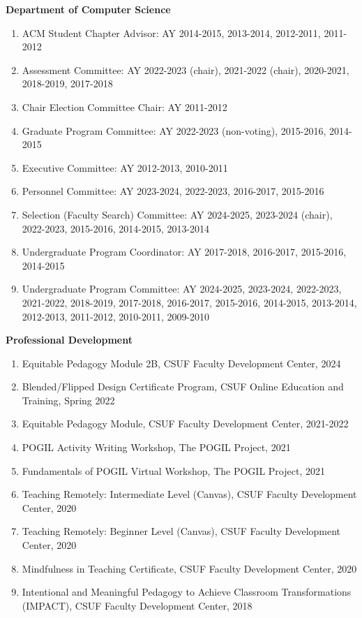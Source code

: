 \documentclass[11pt]{letter}
\begin{document}
\textbf{Department of Computer Science}
\begin{enumerate}
\item ACM Student Chapter Advisor: AY 2014-2015, 2013-2014, 2012-2011, 2011-2012
\item Assessment Committee: AY 2022-2023 (chair), 2021-2022 (chair), 2020-2021, 2018-2019, 2017-2018
\item Chair Election Committee Chair: AY 2011-2012
\item Graduate Program Committee: AY 2022-2023 (non-voting), 2015-2016, 2014-2015
\item Executive Committee: AY 2012-2013, 2010-2011
\item Personnel Committee: AY 2023-2024, 2022-2023, 2016-2017, 2015-2016
\item Selection (Faculty Search) Committee: AY 2024-2025, 2023-2024 (chair), 2022-2023, 2015-2016, 2014-2015, 2013-2014
\item Undergraduate Program Coordinator: AY 2017-2018, 2016-2017, 2015-2016, 2014-2015
\item Undergraduate Program Committee: AY 2024-2025, 2023-2024, 2022-2023, 2021-2022, 2018-2019, 2017-2018, 2016-2017, 2015-2016, 2014-2015, 2013-2014, 2012-2013, 2011-2012, 2010-2011, 2009-2010
\end{enumerate}

\textbf{Professional Development}
\begin{enumerate}
  \item Equitable Pedagogy Module 2B, CSUF Faculty Development Center, 2024
  \item Blended/Flipped Design Certificate Program, CSUF Online Education and Training, Spring 2022
  \item Equitable Pedagogy Module, CSUF Faculty Development Center, 2021-2022
  \item POGIL Activity Writing Workshop, The POGIL Project, 2021
  \item Fundamentals of POGIL Virtual Workshop, The POGIL Project, 2021
  \item Teaching Remotely: Intermediate Level (Canvas), CSUF Faculty Development Center, 2020
  \item Teaching Remotely: Beginner Level (Canvas), CSUF Faculty Development Center, 2020
  \item Mindfulness in Teaching Certificate, CSUF Faculty Development Center, 2020
  \item Intentional and Meaningful Pedagogy to Achieve Classroom Transformations (IMPACT), CSUF Faculty Development Center, 2018
\end{enumerate}
\end{document}
